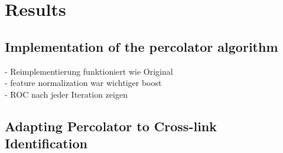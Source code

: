 \chapter{Results}
\label{results}


\section{Implementation of the percolator algorithm}
- Reimplementierung funktioniert wie Original\\
- feature normalization war wichtiger boost\\
- ROC nach jeder Iteration zeigen

\section{Adapting Percolator to Cross-link Identification}
